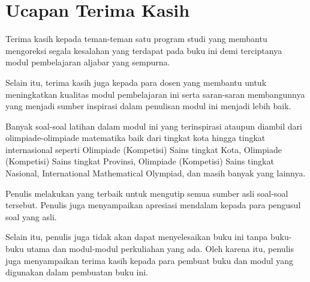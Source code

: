\chapter{Ucapan Terima Kasih}

Terima kasih kepada teman-teman satu program studi yang membantu mengoreksi segala kesalahan yang terdapat pada buku ini demi terciptanya modul pembelajaran aljabar yang sempurna.
\par Selain itu, terima kasih juga kepada para dosen yang membantu untuk meningkatkan kualitas modul pembelajaran ini serta saran-saran membangunnya yang menjadi sumber inspirasi dalam penulisan modul ini menjadi lebih baik.
\par Banyak soal-soal latihan dalam modul ini yang terinspirasi ataupun diambil dari olimpiade-olimpiade matematika baik dari tingkat kota hingga tingkat internasional seperti Olimpiade (Kompetisi) Sains tingkat Kota, Olimpiade (Kompetisi) Sains tingkat Provinsi, Olimpiade (Kompetisi) Sains tingkat Nasional, International Mathematical Olympiad, dan masih banyak yang lainnya.
\par Penulis melakukan yang terbaik untuk mengutip semua sumber asli soal-soal tersebut. Penulis juga menyampaikan apresiasi mendalam kepada para pengusul soal yang asli.
\par Selain itu, penulis juga tidak akan dapat menyelesaikan buku ini tanpa buku-buku utama dan modul-modul perkuliahan yang ada. Oleh karena itu, penulis juga menyampaikan terima kasih kepada para pembuat buku dan modul yang digunakan dalam pembuatan buku ini.
